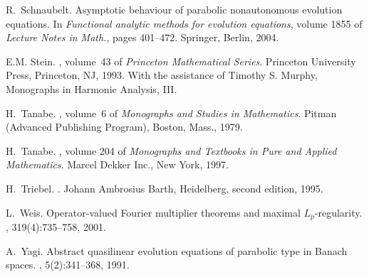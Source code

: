\documentclass{amsart}
\theoremstyle{plain}
\theoremstyle{remark}
\theoremstyle{plain}
\numberwithin{equation}{section}
\begin{document}
\begin{thebibliography}{10}
R.~Schnaubelt.
\newblock Asymptotic behaviour of parabolic nonautonomous evolution equations.
\newblock In {\em Functional analytic methods for evolution equations}, volume
  1855 of {\em Lecture Notes in Math.}, pages 401--472. Springer, Berlin, 2004.

E.M. Stein.
, volume~43 of {\em Princeton Mathematical Series}.
\newblock Princeton University Press, Princeton, NJ, 1993.
\newblock With the assistance of Timothy S. Murphy, Monographs in Harmonic
  Analysis, III.

H.~Tanabe.
, volume~6 of {\em Monographs and Studies
  in Mathematics}.
\newblock Pitman (Advanced Publishing Program), Boston, Mass., 1979.

H.~Tanabe.
,
  volume 204 of {\em Monographs and Textbooks in Pure and Applied Mathematics}.
\newblock Marcel Dekker Inc., New York, 1997.

H.~Triebel.
.
\newblock Johann Ambrosius Barth, Heidelberg, second edition, 1995.

L.~Weis.
\newblock Operator-valued {F}ourier multiplier theorems and maximal
  {$L_p$}-regularity.
, 319(4):735--758, 2001.

A.~Yagi.
\newblock Abstract quasilinear evolution equations of parabolic type in
  {B}anach spaces.
, 5(2):341--368, 1991.

\end{thebibliography}
\end{document}
